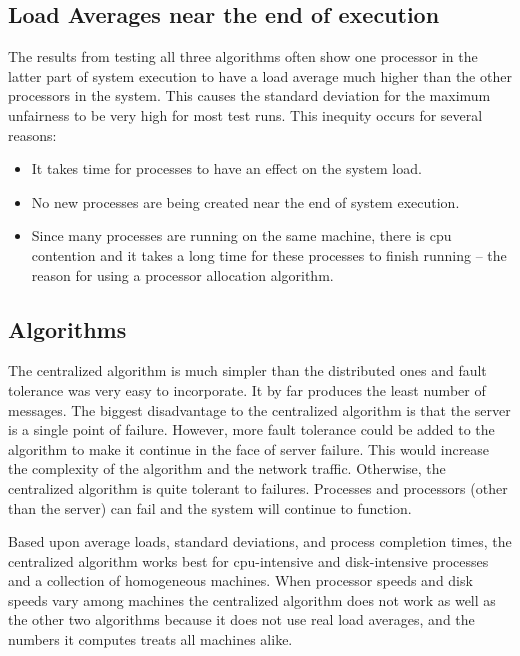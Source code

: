 \documentclass{report}
\begin{document}
\subsection{Load Averages near the end of execution}
\label{sec:lddiff}


The results from testing all three algorithms often show one processor in
the latter part of system execution to have a load average much higher than
the other processors in the system.  This causes the standard deviation for
the maximum unfairness to be very high for most test runs.  This inequity
occurs for several reasons:

\begin{itemize}
	\item It takes time for processes to have an effect on the system
		load.  
	\item No new processes are being created near the end of system
		execution.  

	\item Since many processes are running on the same machine, there
		is cpu contention and it takes a long time for these
		processes to finish running -- the reason for using a
		processor allocation algorithm. 
\end{itemize}



\subsection{Algorithms}

The centralized algorithm is much simpler than the distributed ones and
fault tolerance was very easy to incorporate.  It by far produces the least
number of messages.  The biggest disadvantage to the centralized algorithm is
that the server is a single point of failure.  However, more fault tolerance
could be added to the algorithm to make it continue in the face of server
failure.  This would increase the complexity of the algorithm and the
network traffic.  Otherwise, the centralized algorithm is quite tolerant to
failures.  Processes and processors (other than the server) can fail and the
system will continue to function.  

Based upon average loads, standard deviations, and process completion times,
the centralized algorithm works best for cpu-intensive and disk-intensive
processes and a collection of homogeneous machines.  When processor speeds
and disk speeds vary among machines the centralized algorithm does not work
as well as the other two algorithms because it does not use real load
averages, and the numbers it computes treats all machines alike.
\end{document}
